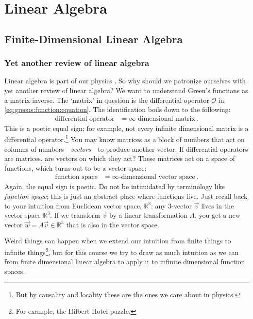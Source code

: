 \documentclass[
  11pt,
	colorful,
	raggedright,
]{tufte-style-thesis-flip}
\begin{document}
\part{Linear Algebra}

\chapter{Finite-Dimensional Linear Algebra}

\section{Yet another review of linear algebra}

Linear algebra is part of our physics . So why should we patronize ourselves with yet another review of linear algebra?
%
We want to understand Green’s functions as a matrix inverse. The `matrix' in question is the differential operator $\mathcal O$ in \eqref{eq:greens:function:equation}.
%
The identification boils down to the following:
\begin{align}
  \text{differential operator}
  &=
  \infty\text{-dimensional matrix} \ .
\end{align}
This is a poetic equal sign; for example, not every infinite dimensional matrix is a differential operator.\footnote{But by causality and locality these are the ones we care about in physics.} You may know matrices as a block of numbers that act on columns of numbers---\emph{vectors}---to produce another vector.
If differential operators are matrices, are vectors on which they act? These matrices act on a space of functions, which turns out to be a vector space:
\begin{align}
  \text{function space} &= \infty\text{-dimensional vector space} \ .
\end{align}
Again, the equal sign is poetic. 
Do not be intimidated by terminology like \emph{function space}; this is just an abstract place where functions live. Just recall back to your intuition from  Euclidean vector space, $\mathbb{R}^3$: any 3-vector $\vec{v}$ lives in the vector space $\mathbb{R}^3$. If we transform $\vec{v}$ by a linear transformation ${A}$, you get a new vector  $\vec{w} = {A}\vec{v} \in \mathbb{R}^3$ that is also in the vector space.

%
Weird things can happen when we extend our intuition from finite things to infinite things\footnote{For example, the Hilbert Hotel puzzle.}, but for this course we try to draw as much intuition as we can from finite dimensional linear algebra to apply it to infinite dimensional function spaces.
\end{document}
